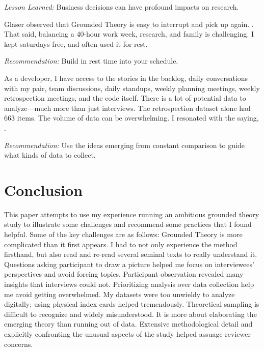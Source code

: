 \textit{Lesson Learned:} Business decisions can have profound impacts on research. 

Glaser observed that Grounded Theory is easy to interrupt and pick up again.  \cite{GlaserIssues}. That said, balancing a 40-hour work week, research, and family is challenging. I kept saturdays free, and often used it for rest. 

\textit{Recommendation:} Build in rest time into your schedule.

As a developer, I have access to the stories in the backlog, daily conversations with my pair, team discussions, daily standups, weekly planning meetings, weekly retrospection meetings,  and the code itself. There is a lot of potential data to analyze---much more than just interviews. The retrospection dataset alone had 663 items. The volume of data can be overwhelming. I resonated with the saying,  \cite{Charmaz}. 

\textit{Recommendation:} Use the ideas emerging from constant comparison to guide what kinds of data to collect. 
\section{Conclusion}
\label{Conclusion}
This paper attempts to use my experience running an ambitious grounded theory study to illustrate some challenges and recommend some practices that I found helpful. Some of the key challenges are as follows:
Grounded Theory is more complicated than it first appears. I had to not only experience the method firsthand, but also read and re-read several seminal texts to really understand it.
Questions asking participant to draw a picture helped me focus on interviewees' perspectives and avoid forcing topics. 
Participant observation revealed many insights that interviews could not. 
Prioritizing analysis over data collection help me avoid getting overwhelmed.
My datasets were too unwieldy to analyze digitally; using physical index cards helped tremendously. 
Theoretical sampling is difficult to recognize and widely misunderstood. It is more about elaborating the emerging theory than running out of data. 
Extensive methodological detail and explicitly confronting the unusual aspects of the study helped assuage reviewer concerns. 

